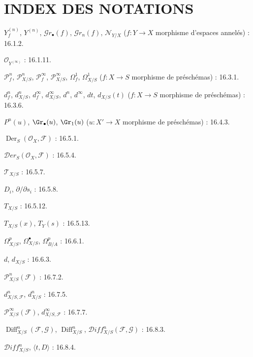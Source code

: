 {}
\section*{INDEX DES NOTATIONS}

\begingroup
\small
\setlength{\parindent}{0pt}
\setlength{\parskip}{1.5pt}

$Y_f^{(n)}$, $Y^{(n)}$, $\mathcal{G}r_{\bullet}(f)$,
$\mathcal{G}r_n(f)$, $\mathcal{N}_{Y/X}$
($f:Y\to X$ morphisme d'espaces annelés) : 16.1.2.

$\mathcal{O}_{Y^{(\infty)}}$ : 16.1.11.

$\mathcal{P}^{n}_{f}$, $\mathcal{P}^{n}_{X/S}$,
$\mathcal{P}^{\infty}_{f}$, $\mathcal{P}^{\infty}_{X/S}$,
$\Omega^{1}_{f}$, $\Omega^{1}_{X/S}$
($f:X\to S$ morphisme de préschémas) : 16.3.1.

$d^{n}_{f}$, $d^{n}_{X/S}$, $d^{\infty}_{f}$,
$d^{\infty}_{X/S}$, $d^{n}$, $d^{\infty}$, $dt$, $d_{X/S}(t)$
($f:X\to S$ morphisme de préschémas) : 16.3.6.

$P^{n}(u)$, $\Gr_{\bullet}(u)$, $\Gr_{1}(u)$
($u:X'\to X$ morphisme de préschémas) : 16.4.3.

$\operatorname{Der}_{S}(\mathcal{O}_{X},\mathcal{F})$ : 16.5.1.

$\mathcal{D}er_{S}(\mathcal{O}_{X},\mathcal{F})$ : 16.5.4.

$\mathcal{T}_{X/S}$ : 16.5.7.

$D_i$, $\partial/\partial s_i$ : 16.5.8.

$T_{X/S}$ : 16.5.12.

$T_{X/S}(x)$, $T_Y(s)$ : 16.5.13.

$\Omega^p_{X/S}$, $\Omega^\bullet_{X/S}$, $\Omega^p_{B/A}$ : 16.6.1.

$d$, $d_{X/S}$ : 16.6.3.

$\mathcal{P}^n_{X/S}(\mathcal{F})$ : 16.7.2.

$d^n_{X/S,\mathcal{F}}$, $d^n_{X/S}$ : 16.7.5.

$\mathcal{P}^{\infty}_{X/S}(\mathcal{F})$,
$d^{\infty}_{X/S,\mathcal{F}}$ : 16.7.7.

$\operatorname{Diff}^{n}_{X/S}(\mathcal{F},\mathcal{G})$,
$\operatorname{Diff}^{n}_{X/S}$,
$\mathcal{D}iff^{n}_{X/S}(\mathcal{F},\mathcal{G})$ : 16.8.3.

$\mathcal{D}iff^{n}_{X/S}$, $\langle t,D\rangle$ : 16.8.4.


